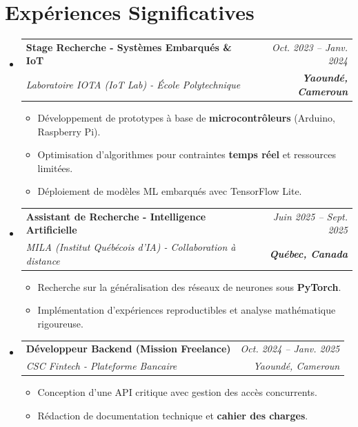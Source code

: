 \documentclass[a4paper,11pt]{article}
\makeatletter
\newcommand{\resumeSubheading}[4]{
  \vspace{-1pt}\item
    \begin{tabular*}{0.97\textwidth}[t]{l@{\extracolsep{\fill}}r}
      \textbf{#1} & \textit{\small #2} \\
      \textit{\small #3} & \textit{\small #4} \\
    \end{tabular*}\vspace{-5pt}
}
\makeatother
\begin{document}
\section{Expériences Significatives}
\begin{itemize}[leftmargin=*, label={}]

    \resumeSubheading
      {Stage Recherche - Systèmes Embarqués \& IoT}{Oct. 2023 -- Janv. 2024}
      {Laboratoire IOTA (IoT Lab) - École Polytechnique}{\textbf{Yaoundé, Cameroun}}
      \begin{itemize}[leftmargin=0.4cm, nosep, label=\tiny$\bullet$]
        \item \small{Développement de prototypes à base de \textbf{microcontrôleurs} (Arduino, Raspberry Pi).}
        \item \small{Optimisation d'algorithmes pour contraintes \textbf{temps réel} et ressources limitées.}
        \item \small{Déploiement de modèles ML embarqués avec TensorFlow Lite.}
      \end{itemize}
    \vspace{2pt}

    \resumeSubheading
      {Assistant de Recherche - Intelligence Artificielle}{Juin 2025 -- Sept. 2025}
      {MILA (Institut Québécois d'IA) - Collaboration à distance}{\textbf{Québec, Canada}}
      \begin{itemize}[leftmargin=0.4cm, nosep, label=\tiny$\bullet$]
        \item \small{Recherche sur la généralisation des réseaux de neurones sous \textbf{PyTorch}.}
        \item \small{Implémentation d'expériences reproductibles et analyse mathématique rigoureuse.}
      \end{itemize}
    \vspace{2pt}

    \resumeSubheading
      {Développeur Backend (Mission Freelance)}{Oct. 2024 -- Janv. 2025}
      {CSC Fintech - Plateforme Bancaire}{Yaoundé, Cameroun}
      \begin{itemize}[leftmargin=0.4cm, nosep, label=\tiny$\bullet$]
        \item \small{Conception d'une API critique avec gestion des accès concurrents.}
        \item \small{Rédaction de documentation technique et \textbf{cahier des charges}.}
      \end{itemize}
\end{itemize}
\end{document}
